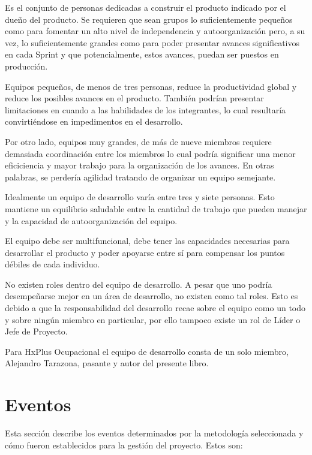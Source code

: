         Es el conjunto de personas dedicadas a construir el producto indicado por el dueño del producto. Se requieren que sean grupos lo suficientemente pequeños como para fomentar un alto nivel de independencia y autoorganización pero, a su vez, lo suficientemente grandes como para poder presentar avances significativos en cada Sprint y que potencialmente, estos avances, puedan ser puestos en producción.
        
        Equipos pequeños, de menos de tres personas, reduce la productividad global y reduce los posibles avances en el producto. También podrían presentar limitaciones en cuando a las habilidades de los integrantes, lo cual resultaría convirtiéndose en impedimentos en el desarrollo.
        
        Por otro lado, equipos muy grandes, de más de nueve miembros requiere demasiada coordinación entre los miembros lo cual podría significar una menor eficiciencia y mayor trabajo para la organización de los avances. En otras palabras, se perdería agilidad tratando de organizar un equipo semejante.
        
        Idealmente un equipo de desarrollo varía entre tres y siete personas. Esto mantiene un equilibrio saludable entre la cantidad de trabajo que pueden manejar y la capacidad de autoorganización del equipo.
        
        El equipo debe ser multifuncional, debe tener las capacidades necesarias para desarrollar el producto y poder apoyarse entre sí para compensar los puntos débiles de cada individuo.
        
        No existen roles dentro del equipo de desarrollo. A pesar que uno podría desempeñarse mejor en un área de desarrollo, no existen como tal roles. Esto es debido a que la responsabilidad del desarrollo recae sobre el equipo como un todo y sobre ningún miembro en particular, por ello tampoco existe un rol de Líder o Jefe de Proyecto.
        
        Para HxPlus Ocupacional el equipo de desarrollo consta de un solo miembro, Alejandro Tarazona, pasante y autor del presente libro.
        
    \section{Eventos}
    
    Esta sección describe los eventos determinados por la metodología seleccionada y cómo fueron establecidos para la gestión del proyecto. Estos son:
    
